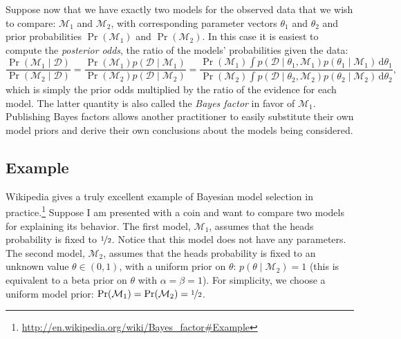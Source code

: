 \documentclass{article}
\newcommand{\given}{\mid}
\newcommand{\mc}[1]{\mathcal{#1}}
\newcommand{\data}{\mc{D}}
\newcommand{\model}{\mc{M}}
\newcommand{\intd}[1]{\,\mathrm{d}{#1}}
\begin{document}
Suppose now that we have exactly two models for the observed data that
we wish to compare: $\model_1$ and $\model_2$, with corresponding
parameter vectors $\theta_1$ and $\theta_2$ and prior probabilities
$\Pr(\model_1)$ and $\Pr(\model_2)$. In this case it is easiest to
compute the \emph{posterior odds}, the ratio of the models'
probabilities given the data:
\begin{equation*}
  \frac{\Pr(\model_1 \given \data)}
       {\Pr(\model_2 \given \data)}
  = \frac{\Pr(\model_1) p(\data \given \model_1)}
         {\Pr(\model_2) p(\data \given \model_2)}
  = \frac{\Pr(\model_1) \int p(\data \given \theta_1, \model_1)
          p(\theta_1 \given \model_1) \intd{\theta_1}}
         {\Pr(\model_2) \int p(\data \given \theta_2, \model_2)
          p(\theta_2 \given \model_2) \intd{\theta_2}},
\end{equation*}
which is simply the prior odds multiplied by the ratio of the evidence
for each model.  The latter quantity is also called the \emph{Bayes
  factor} in favor of $\model_1$.  Publishing Bayes factors allows
another practitioner to easily substitute their own model priors and
derive their own conclusions about the models being considered.

\subsection*{Example}

Wikipedia gives a truly excellent example of Bayesian model selection
in
practice.\footnote{\url{http://en.wikipedia.org/wiki/Bayes_factor#Example}}
Suppose I am presented with a coin and want to compare two models for
explaining its behavior.  The first model, $\model_1$, assumes that
the heads probability is fixed to $\nicefrac{1}{2}$.  Notice that this
model does not have any parameters.  The second model, $\model_2$,
assumes that the heads probability is fixed to an unknown value
$\theta \in (0, 1)$, with a uniform prior on $\theta$: $p(\theta
\given \model_2) = 1$ (this is equivalent to a beta prior on $\theta$
with $\alpha = \beta = 1$).  For simplicity, we choose a uniform model
prior: $\Pr(\model_1) = \Pr(\model_2) = \nicefrac{1}{2}$.
\end{document}
